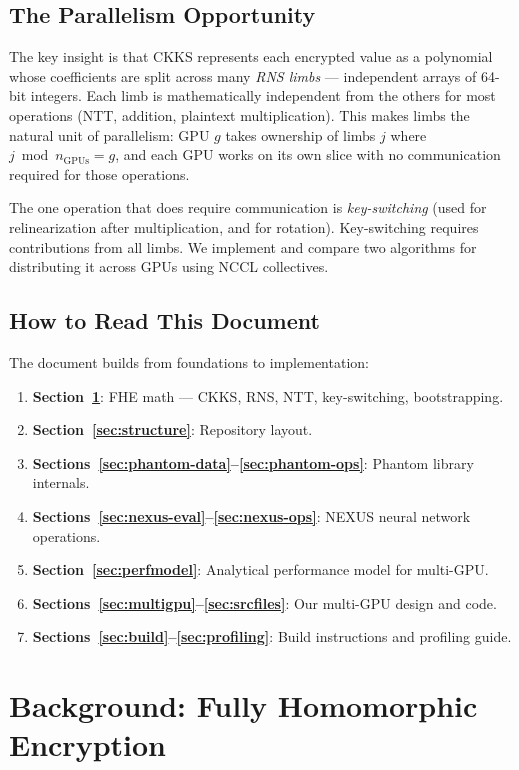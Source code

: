 \documentclass[11pt,letterpaper]{article}
\begin{document}
\subsection{The Parallelism Opportunity}

The key insight is that CKKS represents each encrypted value as a polynomial whose coefficients
are split across many \emph{RNS limbs} --- independent arrays of 64-bit integers. Each limb is
mathematically independent from the others for most operations (NTT, addition, plaintext
multiplication). This makes limbs the natural unit of parallelism: GPU $g$ takes ownership of
limbs $j$ where $j \bmod n_\text{GPUs} = g$, and each GPU works on its own slice with no
communication required for those operations.

The one operation that does require communication is \emph{key-switching} (used for
relinearization after multiplication, and for rotation). Key-switching requires contributions
from all limbs. We implement and compare two algorithms for distributing it across GPUs using
NCCL collectives.

\subsection{How to Read This Document}

The document builds from foundations to implementation:
\begin{enumerate}[noitemsep]
  \item \textbf{Section~\ref{sec:background}}: FHE math --- CKKS, RNS, NTT, key-switching, bootstrapping.
  \item \textbf{Section~\ref{sec:structure}}: Repository layout.
  \item \textbf{Sections~\ref{sec:phantom-data}--\ref{sec:phantom-ops}}: Phantom library internals.
  \item \textbf{Sections~\ref{sec:nexus-eval}--\ref{sec:nexus-ops}}: NEXUS neural network operations.
  \item \textbf{Section~\ref{sec:perfmodel}}: Analytical performance model for multi-GPU.
  \item \textbf{Sections~\ref{sec:multigpu}--\ref{sec:srcfiles}}: Our multi-GPU design and code.
  \item \textbf{Sections~\ref{sec:build}--\ref{sec:profiling}}: Build instructions and profiling guide.
\end{enumerate}

\section{Background: Fully Homomorphic Encryption}
\label{sec:background}
\end{document}
